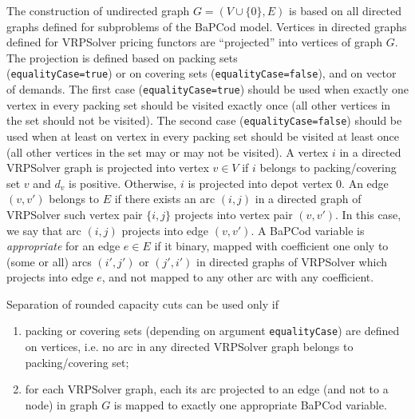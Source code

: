 \documentclass[10pt,a4paper]{article}
\newcommand{\bc}{BaPCod\xspace}
\begin{document}
The construction of undirected graph $G=(V\cup\{0\},E)$ is based on all directed graphs defined for subproblems of the
\bc model. Vertices in directed graphs defined for VRPSolver pricing functors are ``projected'' into vertices of graph
$G$. The projection is defined based on packing sets\\ (\verb+equalityCase=true+) or on covering sets
(\verb+equalityCase=false+), and on vector of demands. The first case (\verb+equalityCase=true+) should be used when
exactly one vertex in every packing set should be visited exactly once (all other vertices in the set should not be
visited). The second case (\verb+equalityCase=false+) should be used when at least on vertex in every packing set should
be visited at least once (all other vertices in the set may or may not be visited). A vertex $i$ in a directed VRPSolver
graph is projected into vertex $v\in V$ if $i$ belongs to packing/covering set $v$ and $d_v$ is positive. Otherwise, $i$
is projected into depot vertex $0$. An edge $(v,v')$ belongs to $E$ if there exists an arc $(i,j)$ in a directed graph
of VRPSolver such vertex pair $\{i,j\}$ projects into vertex pair $(v,v')$. In this case, we say that arc $(i,j)$
projects into edge $(v,v')$. A \bc variable is \emph{appropriate} for an edge $e\in E$ if it binary, mapped with
coefficient one only to (some or all) arcs $(i',j')$ or $(j',i')$ in directed graphs of VRPSolver which projects into
edge $e$, and not mapped to any other arc with any coefficient.

Separation of rounded capacity cuts can be used only if
\begin{enumerate}
\item packing or covering sets (depending on argument \verb+equalityCase+) are defined on vertices, i.e. no arc in any
  directed VRPSolver graph belongs to packing/covering set;
\item for each VRPSolver graph, each its arc projected to an edge (and not to a node) in graph $G$ is mapped to exactly
  one appropriate \bc variable.
\end{enumerate}
\end{document}
